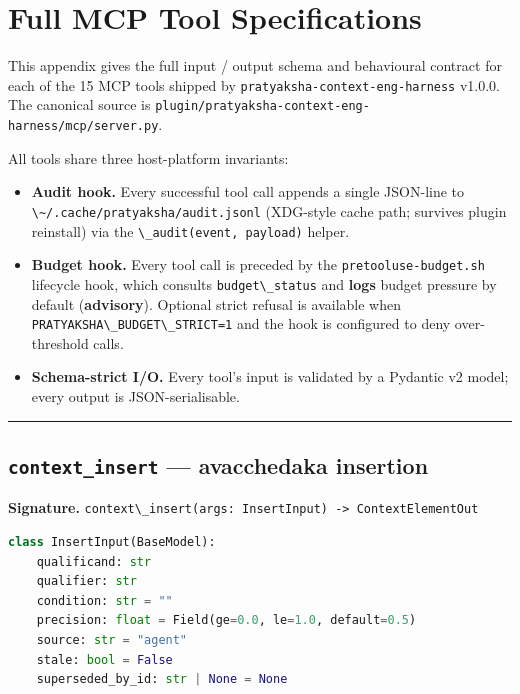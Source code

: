 \section{Full MCP Tool Specifications}\label{full-mcp-tool-specifications}

This appendix gives the full input / output schema and behavioural contract for each of the 15 MCP tools shipped by \passthrough{\lstinline!pratyaksha-context-eng-harness!} v1.0.0. The canonical source is \passthrough{\lstinline!plugin/pratyaksha-context-eng-harness/mcp/server.py!}.

All tools share three host-platform invariants:

\begin{itemize}
\tightlist
\item
  \textbf{Audit hook.} Every successful tool call appends a single JSON-line to \passthrough{\lstinline!\~/.cache/pratyaksha/audit.jsonl!} (XDG-style cache path; survives plugin reinstall) via the \passthrough{\lstinline!\_audit(event, payload)!} helper.
\item
  \textbf{Budget hook.} Every tool call is preceded by the \passthrough{\lstinline!pretooluse-budget.sh!} lifecycle hook, which consults \passthrough{\lstinline!budget\_status!} and \textbf{logs} budget pressure by default (\textbf{advisory}). Optional strict refusal is available when \passthrough{\lstinline!PRATYAKSHA\_BUDGET\_STRICT=1!} and the hook is configured to deny over-threshold calls.
\item
  \textbf{Schema-strict I/O.} Every tool's input is validated by a Pydantic v2 model; every output is JSON-serialisable.
\end{itemize}

\begin{center}\rule{0.5\linewidth}{0.5pt}\end{center}

\subsection{\texorpdfstring{\texttt{context\_insert} --- avacchedaka insertion}{context\_insert --- avacchedaka insertion}}\label{context_insert-avacchedaka-insertion}

\textbf{Signature.} \passthrough{\lstinline!context\_insert(args: InsertInput) -> ContextElementOut!}

\begin{lstlisting}[language=Python]
class InsertInput(BaseModel):
    qualificand: str
    qualifier: str
    condition: str = ""
    precision: float = Field(ge=0.0, le=1.0, default=0.5)
    source: str = "agent"
    stale: bool = False
    superseded_by_id: str | None = None
\end{lstlisting}

